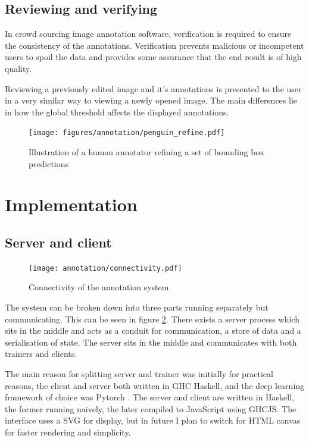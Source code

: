 \subsection {Reviewing and verifying}

In crowd sourcing image annotation software, verification is required to ensure the consistency of the annotations. Verification prevents malicious or incompetent users to spoil the data and provides some assurance that the end result is of high quality. 



Reviewing a previously edited image and it's annotations is presented to the user in a very similar way to viewing a newly opened image. The main differences lie in how the global threshold affects the displayed annotations. 





\begin{figure}[h!]
  \centering
  \texttt{[image: figures/annotation/penguin\_refine.pdf]}
  \caption{Illustration of a human annotator refining a set of bounding box predictions }   
  \label{fig:penguin_refinement}
\end{figure}




\section {Implementation}

\subsection{Server and client}

\begin{figure}[h!]
  \centering
  \texttt{[image: annotation/connectivity.pdf]}
  \caption{Connectivity of the annotation system}  
  \label{fig:connectivity}
\end{figure}

The system can be broken down into three parts running separately but communicating. This can be seen in figure \ref{fig:connectivity}. There exists a server process which sits in the middle and acts as a conduit for communication, a store of data and a serialisation of state. The server sits in the middle and communicates with both trainers and clients.

The main reason for splitting server and trainer was initially for practical reasons, the client and server both written in \gls{GHC} Haskell, and the deep learning framework of choice was Pytorch \cite{Paszke2017}. The server and client are written in Haskell, the former running naively, the later compiled to JavaScript using \gls{GHCJS}. The interface uses a \gls{SVG} for display, but in future I plan to switch for \gls{HTML} canvas for faster rendering and simplicity.

